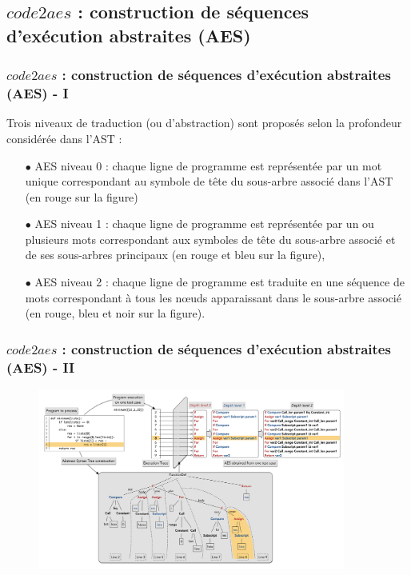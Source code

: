 \documentclass[xcolor=dvipsnames]{beamer}
\begin{document}
\subsection{$code2aes$ : construction de séquences d'exécution abstraites (AES)}
\begin{frame}
\frametitle{$code2aes$ : construction de séquences d'exécution abstraites (AES) - I}
Trois niveaux de traduction (ou d'abstraction) sont proposés selon la profondeur considérée dans l'AST :
\begin{itemize}
\item[$\bullet$] AES niveau 0 : chaque ligne de programme est représentée par un mot unique correspondant au symbole de tête du sous-arbre associé dans l'AST (en rouge sur la figure)

\item[$\bullet$] AES niveau 1 : chaque ligne de programme est représentée par un ou plusieurs mots correspondant aux symboles de tête du sous-arbre associé et de ses sous-arbres principaux (en rouge et bleu sur la figure),

\item[$\bullet$] AES niveau 2 : chaque ligne de programme est traduite en une séquence de mots correspondant à tous les nœuds apparaissant dans le sous-arbre associé (en rouge, bleu et noir sur la figure).
\end{itemize}
\end{frame}

\begin{frame}[fragile]
\frametitle{$code2aes$ : construction de séquences d'exécution abstraites (AES) - II}
\begin{figure}[ht]
\begin{center}
\includegraphics[width= 0.9\textwidth]{./images/Figure_3.png}
\end{center}
\end{figure}
\end{frame}
\end{document}
